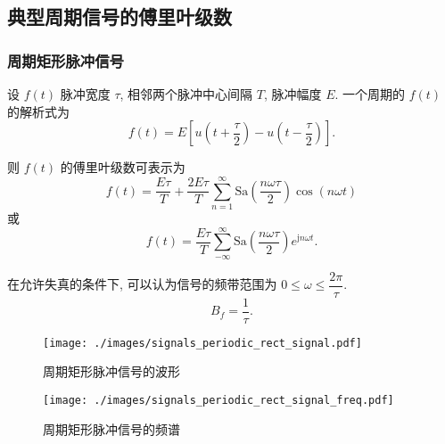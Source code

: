 \subsection{典型周期信号的傅里叶级数} \label{3 典型周期信号的傅里叶级数}
\subsubsection{周期矩形脉冲信号}
设 $f(t)$ 脉冲宽度 $\tau$, 相邻两个脉冲中心间隔 $T$, 脉冲幅度 $E$. 一个周期的 $f(t)$ 的解析式为
\begin{equation}
    f(t)=E\left[u\left(t+\frac{\tau}{2}\right)-u\left(t-\frac{\tau}{2}\right)\right].
\end{equation}

则 $f(t)$ 的傅里叶级数可表示为
\begin{equation}
    f(t)=\frac{E\tau}{T}+\frac{2E\tau}{T}\sum_{n=1}^{\infty}\mathrm{Sa}\left(\frac{n\omega\tau}{2}\right)\cos(n\omega t)
\end{equation}
或
\begin{equation}
    f(t)=\frac{E\tau}{T}\sum_{-\infty}^{\infty}\mathrm{Sa}\left(\frac{n\omega\tau}{2}\right)e^{\mathrm{j}n\omega t}.
\end{equation}

在允许失真的条件下, 可以认为信号的频带范围为 $0\leq \omega\leq \dfrac{2\pi}{\tau}$.
\begin{equation} \label{eq:3.2 periodic rect signal Bf}
    B_f=\frac{1}{\tau}.
\end{equation}

\begin{figure}[H]
    \centering
    \begin{minipage}{.433\textwidth}
        \centering
        \texttt{[image: ./images/signals\_periodic\_rect\_signal.pdf]}
        \caption{周期矩形脉冲信号的波形}
    \end{minipage}
    \begin{minipage}{.547\textwidth}
        \centering
        \texttt{[image: ./images/signals\_periodic\_rect\_signal\_freq.pdf]}
        \caption{周期矩形脉冲信号的频谱}
    \end{minipage}
\end{figure}

